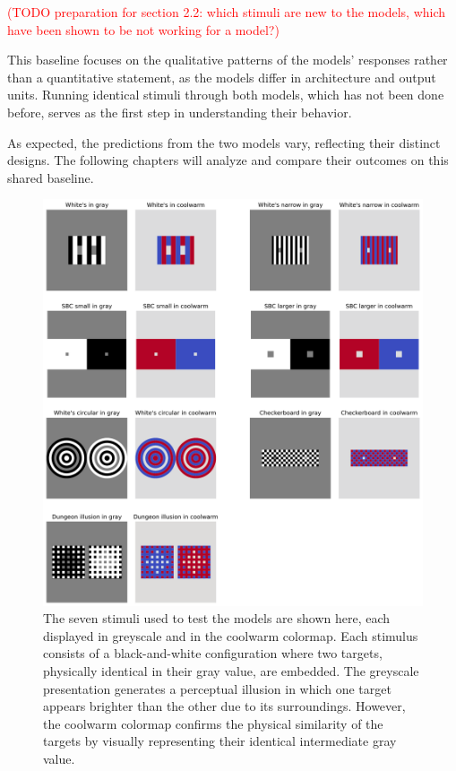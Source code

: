 \textcolor{red}{(TODO preparation for section 2.2: which stimuli are new to the
models, which have been shown to be not working for a model?)}

This baseline focuses on the qualitative patterns of the models' responses rather than a
quantitative statement, as the models differ in architecture and output units. Running
identical stimuli through both models, which has not been done before, serves as the first
step in understanding their behavior. 

As expected, the predictions from the two models vary, reflecting their distinct designs.
The following chapters will analyze and compare their outcomes on this shared baseline.

\begin{figure}[H]
    \centering
    \includegraphics[width=\linewidth]{media/methodology/stimuli.png}
    \begin{minipage}{\textwidth}
    \caption[Overview 7 different stimuli]{The seven stimuli used to test the models are
    shown here, each displayed in greyscale and in the coolwarm colormap. Each stimulus
    consists of a black-and-white configuration where two targets, physically identical in
    their gray value, are embedded. The greyscale presentation generates a perceptual
    illusion in which one target appears brighter than the other due to its surroundings.
    However, the coolwarm colormap confirms the physical similarity of the targets by
    visually representing their identical intermediate gray value.}
    \label{fig:figure9}
    \end{minipage}
\end{figure}

